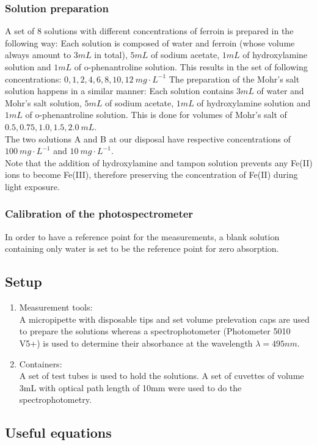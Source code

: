 \documentclass[twocolumn]{article}
\begin{document}
\subsubsection{Solution preparation}
A set of 8 solutions with different concentrations of ferroin is prepared in the following way: Each solution is composed of water and ferroin (whose volume always amount to $3mL$ in total), $5mL$ of sodium acetate, $1mL$ of hydroxylamine solution and $1mL$ of o-phenantroline solution. This results in the set of following concentrations: $0,1,2,4,6,8,10,12 \ mg \cdot L^{-1}$
The preparation of the Mohr's salt solution happens in a similar manner: Each solution contains $3mL$ of water and Mohr's salt solution, $5mL$ of sodium acetate, $1mL$ of hydroxylamine solution and $1mL$ of o-phenantroline solution. This is done for volumes of Mohr's salt of $0.5,0.75,1.0,1.5,2.0 \ mL$. \\
The two  solutions A and B at our disposal have respective concentrations of $100 \ mg \cdot L^{-1}$ and $10 \ mg \cdot L^{-1}$. \\ 
Note that the addition of hydroxylamine and tampon solution prevents any Fe(II) ions to become Fe(III), therefore preserving the concentration of Fe(II) during light exposure.
\subsubsection{Calibration of the photospectrometer}
In order to have a reference point for the measurements, a blank solution containing only water is set to be the reference point for zero absorption.
\subsection{Setup}
\begin{enumerate}
    \item Measurement tools: \\ A micropipette with disposable tips and set volume prelevation caps are used to prepare the solutions whereas a spectrophotometer (Photometer 5010 V5+) is used to determine their absorbance at the wavelength $\lambda = 495nm$.
    \item Containers: \\ A set of test tubes is used to hold the solutions. A set of cuvettes of volume 3mL with optical path length of 10mm were used to do the spectrophotometry.
\end{enumerate}
\subsection{Useful equations}
\end{document}
